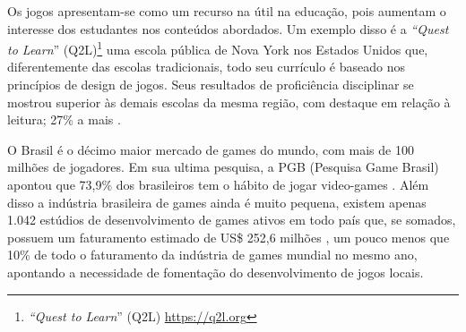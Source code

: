 Os jogos apresentam-se como um recurso na útil na educação, pois aumentam o interesse dos estudantes nos conteúdos abordados. Um exemplo disso é a \textit{“Quest to Learn}” (Q2L)\footnote{\textit{“Quest to Learn}” (Q2L) \url{https://q2l.org}} uma escola pública de Nova York nos Estados Unidos que, diferentemente das escolas tradicionais, todo seu currículo é baseado nos princípios de design de jogos. Seus resultados de proficiência disciplinar se mostrou superior às demais escolas da mesma região, com destaque em relação à leitura; 27\% a mais \cite{Q2L}.

O Brasil é o décimo maior mercado de games do mundo, com mais de 100 milhões de jogadores.
Em sua ultima pesquisa, a PGB (Pesquisa Game Brasil) apontou que 73,9\% dos brasileiros tem o hábito de jogar video-games \cite{PGB}. Além disso a indústria brasileira de games ainda é muito pequena, existem apenas 1.042 estúdios de desenvolvimento de games ativos em todo país que, se somados, possuem um faturamento estimado de US\$ 252,6 milhões \cite{Abragames}, um pouco menos que 10\% de todo o faturamento da indústria de games mundial no mesmo ano, apontando a necessidade de fomentação do desenvolvimento de jogos locais.









